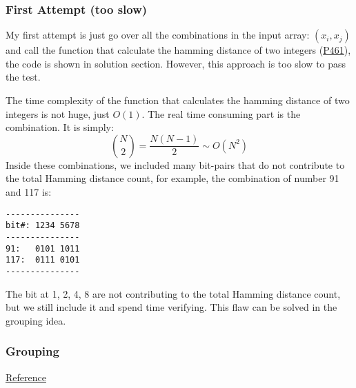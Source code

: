 \documentclass[11pt]{article}
\begin{document}
\subsubsection{First Attempt (too slow)}
\label{sec:org532b225}
My first attempt is just go over all the combinations in the input array: \((x_i, x_j)\) and call the function that calculate the hamming distance of two integers (\hyperref[org12406d9]{P461}), the code is shown in solution section. However, this approach is too slow to pass the test.

The time complexity of the function that calculates the hamming distance of two integers is not huge, just \(O(1)\). The real time consuming part is the combination. It is simply:
\[
{N \choose 2} = \frac{N(N-1)}{2} \sim O(N^2)
\]
Inside these combinations, we included many bit-pairs that do not contribute to the total Hamming distance count, for example, the combination of number 91 and 117 is:
\begin{Verbatim}[frame=single]
---------------
bit#: 1234 5678
---------------
91:   0101 1011
117:  0111 0101
---------------
\end{Verbatim}
The bit at 1, 2, 4, 8 are not contributing to the total Hamming distance count, but we still include it and spend time verifying. This flaw can be solved in the grouping idea.

\subsubsection{Grouping}
\label{sec:org24d64d9}
\href{https://leetcode.com/problems/total-hamming-distance/discuss/96250/C++-O(n)-runtime-O(1)-space}{Reference}
\end{document}
